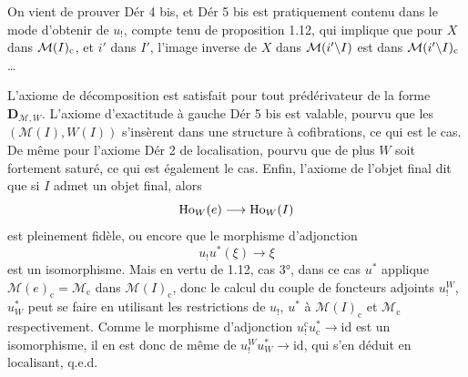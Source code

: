 On vient de prouver Dér 4 bis, et Dér 5 bis est pratiquement contenu dans le mode d'obtenir de $u_!$, compte tenu de proposition 1.12, qui implique que pour $X$ dans $\mathcal{M}(I)_{\mathrm{c}}$, et $i'$ dans $I'$, l'image inverse de $X$ dans $\mathcal{M}(i'\backslash I)$ est dans $\mathcal{M}(i'\backslash I)_{\mathrm{c}}$ \dots


L'axiome de décomposition est satisfait pour tout prédérivateur de la forme $\mathbf{D}_{\mathcal{M},W}$. L'axiome d'exactitude à gauche Dér 5 bis est valable, pourvu que les $(\mathcal{M}(I),W(I))$ s'insèrent dans une structure à cofibrations, ce qui est le cas. De même pour l'axiome Dér 2 de localisation, pourvu que de plus $W$ soit fortement saturé, ce qui est également le cas. Enfin, l'axiome de l'objet final dit que si $I$ admet un objet final, alors
\[ \mathrm{Ho}_W(e) \longrightarrow \mathrm{Ho}_W(I) \]
est pleinement fidèle, ou encore que le morphisme d'adjonction
\[ u_!u^*(\xi) \longrightarrow \xi \]
est un isomorphisme. Mais en vertu de 1.12, cas 3°, dans ce cas $u^*$ applique $\mathcal{M}(e)_{\mathrm{c}} = \mathcal{M}_{\mathrm{c}}$ dans $\mathcal{M}(I)_{\mathrm{c}}$, donc le calcul du couple de foncteurs adjoints $u_!^W$, $u_W^*$ peut se faire en utilisant les restrictions de $u_!$, $u^*$ à $\mathcal{M}(I)_{\mathrm{c}}$ et $\mathcal{M}_{\mathrm{c}}$ respectivement. Comme le morphisme d'adjonction $u_!^{\mathrm{c}}u_{\mathrm{c}}^* \longrightarrow \mathrm{id}$ est un isomorphisme, il en est donc de même de $u_!^W u_W^* \longrightarrow \mathrm{id}$, qui s'en déduit en localisant, q.e.d.


